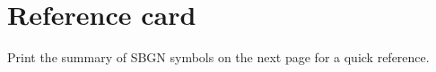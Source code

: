 \chapter{Reference card}
Print the summary of SBGN symbols on the next page for a quick reference.

\noindent{}
